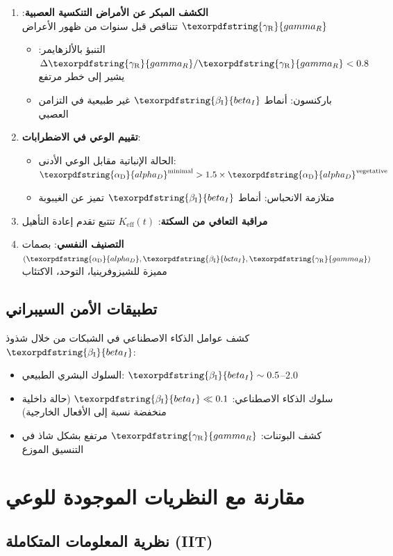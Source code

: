 \documentclass[12pt,a4paper]{article}
\DeclareRobustCommand{\alD}{\texorpdfstring{\ensuremath{\alpha_{\mathrm{D}}}}{alpha_D}}
\DeclareRobustCommand{\beI}{\texorpdfstring{\ensuremath{\beta_{\mathrm{I}}}}{beta_I}}
\DeclareRobustCommand{\gaR}{\texorpdfstring{\ensuremath{\gamma_{\mathrm{R}}}}{gamma_R}}
\newcommand{\eff}{\mathrm{eff}}
\newcommand{\Ke}{K_{\eff}}
\begin{document}
	\begin{enumerate}
		\item \textbf{الكشف المبكر عن الأمراض التنكسية العصبية}: \(\gaR\) تتناقص قبل سنوات من ظهور الأعراض
		\begin{itemize}
			\item التنبؤ بالألزهايمر: \(\Delta\gaR/\gaR < 0.8\) يشير إلى خطر مرتفع
			\item باركنسون: أنماط \(\beI\) غير طبيعية في التزامن العصبي
		\end{itemize}
		
		\item \textbf{تقييم الوعي في الاضطرابات}:
		\begin{itemize}
			\item الحالة الإنباتية مقابل الوعي الأدنى: \(\alD^{\mathrm{minimal}} > 1.5 \times \alD^{\mathrm{vegetative}}\)
			\item متلازمة الانحباس: أنماط \(\beI\) تميز عن الغيبوبة
		\end{itemize}
		
		\item \textbf{مراقبة التعافي من السكتة}: \(\Ke(t)\) تتتبع تقدم إعادة التأهيل
		\item \textbf{التصنيف النفسي}: بصمات \((\alD, \beI, \gaR)\) مميزة للشيزوفرينيا، التوحد، الاكتئاب
	\end{enumerate}
	
	\subsection{تطبيقات الأمن السيبراني}
	
	كشف عوامل الذكاء الاصطناعي في الشبكات من خلال شذوذ \(\beI\):
	\begin{itemize}
		\item السلوك البشري الطبيعي: \(\beI \sim 0.5\)--\(2.0\)
		\item سلوك الذكاء الاصطناعي: \(\beI \ll 0.1\) (حالة داخلية منخفضة نسبة إلى الأفعال الخارجية)
		\item كشف البوتنات: \(\gaR\) مرتفع بشكل شاذ في التنسيق الموزع
	\end{itemize}
	
	\section{مقارنة مع النظريات الموجودة للوعي}
	
	\subsection{نظرية المعلومات المتكاملة (IIT)}
	
\end{document}
